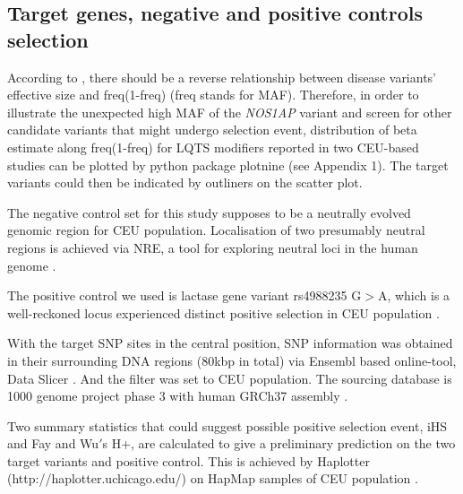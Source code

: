 \documentclass[a4paper,12pt,oneside]{extarticle}
\begin{document}
\subsection{Target genes, negative and positive controls selection}
According to \cite{9}, there should be a reverse relationship between disease variants’ effective size and freq(1-freq) (freq stands for MAF). Therefore, in order to illustrate the unexpected high MAF of the \textit{NOS1AP} variant and screen for other candidate variants that might undergo selection event, distribution of beta estimate along freq(1-freq) for LQTS modifiers reported in two CEU-based studies \cite{4,5} can be plotted by python package plotnine \cite{26} (see Appendix 1). The target variants could then be indicated by outliners on the scatter plot.
\par
The negative control set for this study supposes to be a neutrally evolved genomic region for CEU population. Localisation of two presumably neutral regions is achieved via NRE, a tool for exploring neutral loci in the human genome \cite{27}. 
\par
The positive control we used is lactase gene variant rs4988235 G$>$A, which is a well-reckoned locus experienced distinct positive selection in CEU population \cite{28}. 
\par
With the target SNP sites in the central position, SNP information was obtained in their surrounding DNA regions (80kbp in total) via Ensembl based online-tool, Data Slicer \cite{29}. And the filter was set to CEU population. The sourcing database is 1000 genome project phase 3 with human GRCh37 assembly \cite{30}.
\par
Two summary statistics that could suggest possible positive selection event, iHS and Fay and Wu$'$s H+, are calculated to give a preliminary prediction on the two target variants and positive control. This is achieved by Haplotter (http://haplotter.uchicago.edu/) on HapMap samples of CEU population \cite{16}.
\end{document}
